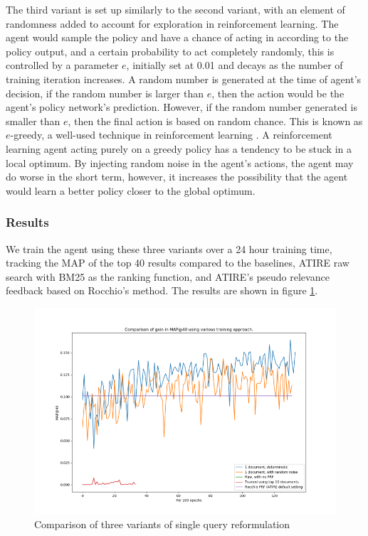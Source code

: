 The third variant is set up similarly to the second variant, with an element of randomness added to account for exploration in reinforcement learning. The agent would sample the policy and have a chance of acting in according to the policy output, and a certain probability to act completely randomly, this is controlled by a parameter $e$, initially set at 0.01 and decays as the number of training iteration increases. A random number is generated at the time of agent's decision, if the random number is larger than $e$, then the action would be the agent's policy network's prediction. However, if the random number generated is smaller than $e$, then the final action is based on random chance.  This is known as $e$-greedy, a well-used technique in reinforcement learning \cite{sutton2018reinforcement}.  A reinforcement learning agent acting purely on a greedy policy has a tendency to be stuck in a local optimum. By injecting random noise in the agent’s actions, the agent may do worse in the short term, however, it increases the possibility that the agent would learn a better policy closer to the global optimum.  

\subsubsection{Results}

We train the agent using these three variants over a 24 hour training time, tracking the MAP of the top 40 results compared to the baselines, ATIRE raw search with BM25 as the ranking function, and ATIRE’s pseudo relevance feedback based on Rocchio’s method. The results are shown in figure \ref{fig:reformulated_single_query}.

\begin{figure}[H]
	\centering
	\includegraphics[width=1\textwidth]{images/chapter_4/1_query.png}
	\caption{Comparison of three variants of single query reformulation}
	\label{fig:reformulated_single_query}
\end{figure}


